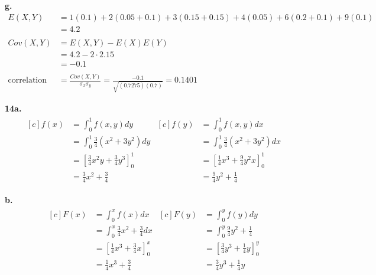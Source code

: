 \documentclass[12pt]{report}
\begin{document}
\noindent \textbf{g.}
\begin{align*}
E(X, Y) &= 1(0.1) + 2(0.05 + 0.1) + 3(0.15 + 0.15) + 4(0.05) + 6(0.2 + 0.1) + 9(0.1)\\
&= 4.2\\\\
Cov(X, Y) &= E(X, Y) - E(X)E(Y)\\
&= 4.2 - 2 \cdot 2.15\\
&= -0.1\\\\
\text{correlation coefficient} &= \frac{Cov(X, Y)}{\sigma_x\sigma_y} = \frac{-0.1}{\sqrt{(0.7275)(0.7)}} = \boxed{0.1401}
\end{align*}

\pagebreak
\noindent \textbf{14a.} 
\begin{align*}
\begin{aligned}[c]
f(x) &= \int_{0}^{1}f(x, y)dy\\
&= \int_0^1\frac{3}{4}\left(x^2 + 3y^2\right)dy\\
&= \left[\frac{3}{4}x^2y+\frac{3}{4}y^3\right]_0^1\\
&= \boxed{\frac{3}{4}x^2+\frac{3}{4}}
\end{aligned}
\begin{aligned}[c]
f(y) &= \int_{0}^{1}f(x, y)dx\\
&= \int_0^1\frac{3}{4}\left(x^2 + 3y^2\right)dx\\
&= \left[\frac{1}{4}x^3 + \frac{9}{4}y^2x\right]_0^1\\
&= \boxed{\frac{9}{4}y^2 + \frac{1}{4}}
\end{aligned}
\end{align*}

\noindent \textbf{b.}
\begin{align*}
\begin{aligned}[c]
F(x) &= \int_{0}^{x}f(x)dx\\
&= \int_{0}^{x}\frac{3}{4}x^2 + \frac{3}{4}dx\\
&= \left[\frac{1}{4}x^3 + \frac{3}{4}x\right]_0^x\\
&= \boxed{\frac{1}{4}x^3+\frac{3}{4}} 
\end{aligned}
\begin{aligned}[c]
F(y) &= \int_{0}^{y}f(y)dy\\
&= \int_{0}^{y}\frac{9}{4}y^2 + \frac{1}{4}\\
&= \left[\frac{3}{4}y^3+\frac{1}{4}y\right]_0^y\\
&= \boxed{\frac{3}{4}y^3+\frac{1}{4}y}
\end{aligned}
\end{align*}
\end{document}
